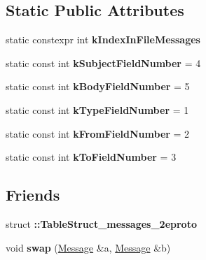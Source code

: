 \subsection*{Static Public Attributes}
\begin{DoxyCompactItemize}
\item 
static constexpr int {\bfseries k\+Index\+In\+File\+Messages}
\item 
\mbox{\label{classtbMessages_1_1Message_a9c2bf31ac8c447b7ec54e4763f31705e}} 
static const int {\bfseries k\+Subject\+Field\+Number} = 4
\item 
\mbox{\label{classtbMessages_1_1Message_a692e0277a7634660b07bd7b68d05a10a}} 
static const int {\bfseries k\+Body\+Field\+Number} = 5
\item 
\mbox{\label{classtbMessages_1_1Message_a8d3ca1c78e102ce19830d8bdba46c83c}} 
static const int {\bfseries k\+Type\+Field\+Number} = 1
\item 
\mbox{\label{classtbMessages_1_1Message_ac8094e7db736130eaf7760df5739ca2f}} 
static const int {\bfseries k\+From\+Field\+Number} = 2
\item 
\mbox{\label{classtbMessages_1_1Message_a503e2ee7a29df895e70779f326f6c3ed}} 
static const int {\bfseries k\+To\+Field\+Number} = 3
\end{DoxyCompactItemize}
\subsection*{Friends}
\begin{DoxyCompactItemize}
\item 
\mbox{\label{classtbMessages_1_1Message_a6669c254757d8a4b2e1f51c0da62dd91}} 
struct {\bfseries \+::\+Table\+Struct\+\_\+messages\+\_\+2eproto}
\item 
\mbox{\label{classtbMessages_1_1Message_a6e15e586b4815095e4aa7f95ffb93c86}} 
void {\bfseries swap} (\hyperlink{classtbMessages_1_1Message}{Message} \&a, \hyperlink{classtbMessages_1_1Message}{Message} \&b)
\end{DoxyCompactItemize}



